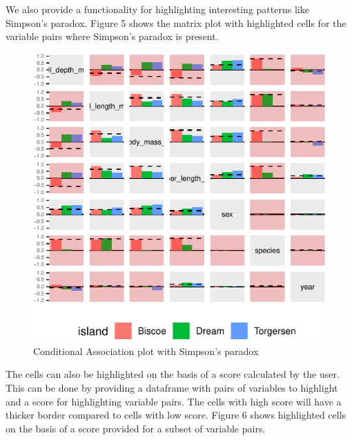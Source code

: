 We also provide a functionality for highlighting interesting patterns
like Simpson's paradox. Figure 5 shows the matrix plot with highlighted
cells for the variable pairs where Simpson's paradox is present.

\begin{Schunk}
\begin{figure}

{\centering \includegraphics{rj_paper_files/figure-latex/unnamed-chunk-12-1} 

}

\caption[Conditional Association plot with Simpson's paradox]{Conditional Association plot with Simpson's paradox}\label{fig:unnamed-chunk-12}
\end{figure}
\end{Schunk}

The cells can also be highlighted on the basis of a score calculated by
the user. This can be done by providing a dataframe with pairs of
variables to highlight and a score for highlighting variable pairs. The
cells with high score will have a thicker border compared to cells with
low score. Figure 6 shows highlighted cells on the basis of a score
provided for a subset of variable pairs.


